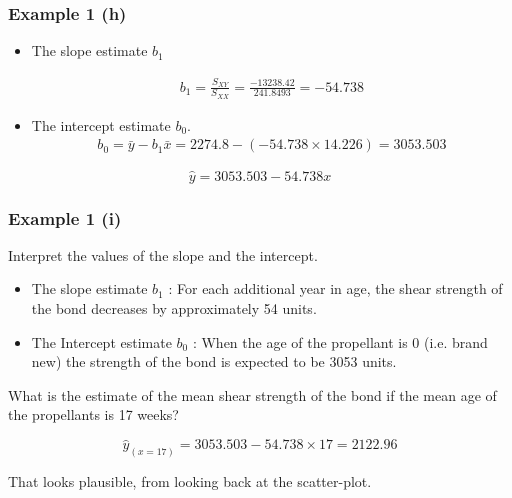 \documentclass[a4]{beamer}
\begin{document}
\begin{frame}
\frametitle{Example 1 (h)}

\begin{itemize}
\item  The slope estimate $b_1$

\begin{eqnarray*}
b_1 = \frac{S_{XY}}{S_{XX}} = \frac{-13238.42}{241.8493} = -54.738
\end{eqnarray*}

\item  The intercept estimate $b_0$.
\begin{eqnarray*}
 b_0 = \bar{y} -b_1\bar{x} = 2274.8 - (-54.738 \times 14.226) = 3053.503
\end{eqnarray*}
\end{itemize}

\[ \hat{y}  = 3053.503 -54.738 x \]

\end{frame}
\begin{frame}
\frametitle{Example 1 (i)}
Interpret the values of the slope and the intercept.
\begin{itemize}
\item  The slope estimate $b_1$ :  For each additional year in age, the shear strength of the bond decreases by approximately 54 units.
\item The Intercept estimate $b_0$ : When the age of the propellant is 0 (i.e. brand new) the strength of the bond is expected to be 3053 units.
\end{itemize}
\bigskip
What is the estimate of the mean shear strength of the bond if the mean age of the propellants is 17 weeks?

\[ \hat{y}_{(x=17)}  = 3053.503 -54.738 \times 17 = 2122.96 \]

That looks plausible, from looking back at the scatter-plot.
\end{frame}
\end{document}
